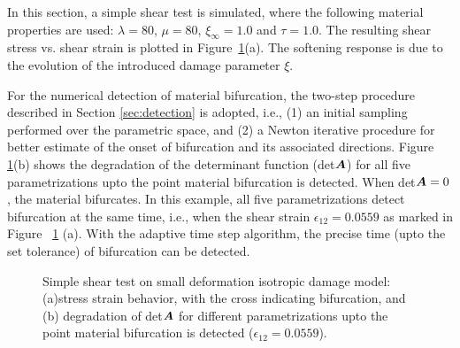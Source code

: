 \documentclass[12pt]{article}
\numberwithin{equation}{section}
\begin{document}
In this section, a simple shear test is simulated, where the following 
material properties are used: $\lambda = 80$, $\mu = 80$, 
$\xi_{\infty} = 1.0$ and $\tau = 1.0$. The resulting shear stress vs. 
shear strain is plotted in Figure~\ref{fig:iso_stress_strain}(a). The 
softening response is due to the evolution of the introduced damage 
parameter $\xi$. 

For the numerical detection of material bifurcation, the two-step 
procedure described in Section \ref{sec:detection} is adopted, i.e., 
(1) an initial sampling performed over the parametric space, and (2) a 
Newton iterative procedure for better estimate of the onset of  
bifurcation and its associated directions. Figure~
\ref{fig:iso_stress_strain}(b) shows the degradation of the 
determinant function (det${\boldsymbol{A}}$) for all five parametrizations upto the 
point material bifurcation is detected. When det${\boldsymbol{A}} = 0$, the 
material bifurcates. In this example, all five parametrizations detect 
bifurcation at the same time, i.e., when the shear strain 
$\epsilon_{12}=0.0559$ as marked in Figure~
\ref{fig:iso_stress_strain} (a). With the adaptive time step 
algorithm, the precise time (upto the set tolerance) of bifurcation 
can be detected.

\begin{figure}[H]
  \centering {} 
  \caption{Simple shear test on small deformation 
  isotropic damage model: 
  (a)stress strain behavior, with the cross indicating bifurcation, and
  (b) degradation of det${\boldsymbol{A}}$ for different
  parametrizations upto the point material bifurcation is detected ($\epsilon_{12}=0.0559$).}
  \label{fig:iso_stress_strain}
\end{figure}
\end{document}

